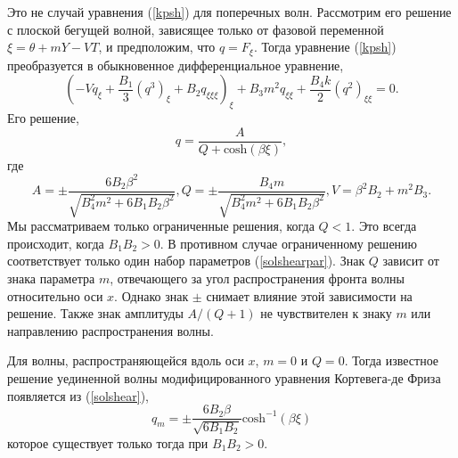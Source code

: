Это не случай уравнения (\ref{kpsh}) для поперечных волн. Рассмотрим его решение с плоской бегущей волной, зависящее только от фазовой переменной $\xi = \theta + m Y - V T$, и предположим, что $ q = F_\xi $. Тогда уравнение (\ref {kpsh}) преобразуется в обыкновенное дифференциальное уравнение,
\[
(-V q_\xi+\frac{B_1}{3} (q^3)_\xi+B_2 q_{\xi\xi\xi})_\xi+B_3m^2  q_{\xi\xi} +\frac{B_4 k}{2} (q^2)_{\xi\xi}=0.
\]
Его решение,
\begin{equation}
	q=\frac{A}{Q+{\text{cosh}( \beta \xi)}},\label{solshear}
\end{equation}
где
\begin{equation}
	A=\pm \frac{6B_2 \beta^2}{\sqrt{B_4^2 m^2+6 B_1 B_2 \beta^2}}, 
	Q=\pm\frac{B_4 m }{\sqrt{B_4^2 m^2+6 B_1 B_2 \beta^2}},  V=\beta^2 B_2+m^2 B_3 . \label{solshearpar}
\end{equation}
Мы рассматриваем только ограниченные решения, когда $Q<1$. Это всегда происходит, когда $B_1 B_2> 0$. В противном случае ограниченному решению соответствует только один набор параметров (\ref{solshearpar}). Знак $Q$ зависит от знака параметра $ m $, отвечающего за угол распространения фронта волны относительно оси $x$. Однако знак $\pm$ снимает влияние этой зависимости на решение. Также знак амплитуды $A / (Q + 1)$ не чувствителен к знаку $m$ или направлению распространения волны.

Для волны, распространяющейся вдоль оси $ x $, $ m = 0 $ и $ Q = 0 $. Тогда известное решение уединенной волны модифицированного уравнения Кортевега-де Фриза появляется из (\ref {solshear}),
\begin{equation}
	q_m=\pm \frac{6B_2 \beta}{\sqrt{6 B_1 B_2}}{\text{cosh}}^{-1}(\beta \xi) \label{qp}
\end{equation}
которое существует только тогда при $ B_1 B_2 > 0 $.

